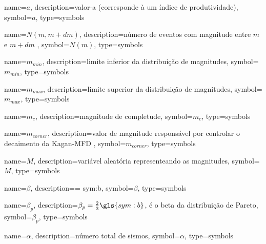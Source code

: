 {
	name={\ensuremath{a}},
	description={valor-a (corresponde à um índice de produtividade)},
	symbol={\ensuremath{a}},
	type=symbols
}


{
	name={\ensuremath{N(m,m+dm)}},
	description={número de eventos com magnitude entre $m$ e $m + dm$ },
	symbol={\ensuremath{N(m)}},
	type=symbols
}


{
	name={\ensuremath{m_{min}}},
	description={limite inferior da distribuição de magnitudes},
	symbol={\ensuremath{m_{min}}},
	type=symbols
}

{
	name={\ensuremath{m_{max}}},
	description={limite superior da distribuição de magnitudes},
	symbol={\ensuremath{m_{max}}},
	type=symbols
}

{
	name={\ensuremath{m_c}},
	description={magnitude de completude},
	symbol={\ensuremath{m_c}},
	type=symbols
}

{
	name={\ensuremath{m_{corner}}},
	description={valor de magnitude responsável por controlar o decaimento da Kagan-MFD },
	symbol={\ensuremath{m_{corner}}},
	type=symbols
}

{
	name={\ensuremath{M}},
	description={variável aleatória representeando as magnitudes},
	symbol={\ensuremath{M}},
	type=symbols
}

{
	name={\ensuremath{\beta}},
	description={\beta = \gls{sym:b}},
	symbol={\ensuremath{\beta}},
	type=symbols
}

{
	name={\ensuremath{\beta_p}},
	description={$\beta_p = \frac{2}{3}\gls{sym:b}$, é o beta da distribuição de Pareto},
	symbol={\ensuremath{\beta_p}},
	type=symbols
}

{
	name={\ensuremath{\alpha}},
	description={número total de sismos},
	symbol={\ensuremath{\alpha}},
	type=symbols
}




